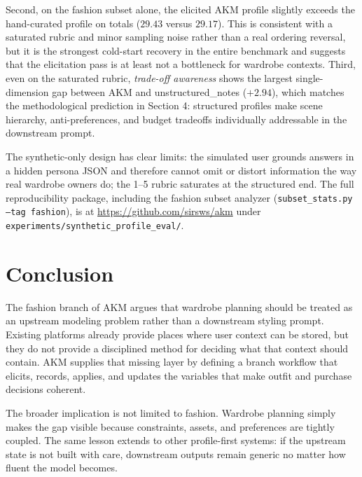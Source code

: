 \documentclass[11pt]{article}
\begin{document}
Second, on the fashion subset alone, the elicited AKM profile slightly exceeds the hand-curated profile on totals ($29.43$ versus $29.17$). This is consistent with a saturated rubric and minor sampling noise rather than a real ordering reversal, but it is the strongest cold-start recovery in the entire benchmark and suggests that the elicitation pass is at least not a bottleneck for wardrobe contexts. Third, even on the saturated rubric, \emph{trade-off awareness} shows the largest single-dimension gap between AKM and unstructured\_notes ($+2.94$), which matches the methodological prediction in Section 4: structured profiles make scene hierarchy, anti-preferences, and budget tradeoffs individually addressable in the downstream prompt.

The synthetic-only design has clear limits: the simulated user grounds answers in a hidden persona JSON and therefore cannot omit or distort information the way real wardrobe owners do; the 1--5 rubric saturates at the structured end. The full reproducibility package, including the fashion subset analyzer (\texttt{subset\_stats.py --tag fashion}), is at \url{https://github.com/sirsws/akm} under \texttt{experiments/synthetic\_profile\_eval/}.

\section{Conclusion}

The fashion branch of AKM argues that wardrobe planning should be treated as an upstream modeling problem rather than a downstream styling prompt. Existing platforms already provide places where user context can be stored, but they do not provide a disciplined method for deciding what that context should contain. AKM supplies that missing layer by defining a branch workflow that elicits, records, applies, and updates the variables that make outfit and purchase decisions coherent.

The broader implication is not limited to fashion. Wardrobe planning simply makes the gap visible because constraints, assets, and preferences are tightly coupled. The same lesson extends to other profile-first systems: if the upstream state is not built with care, downstream outputs remain generic no matter how fluent the model becomes.



\end{document}
